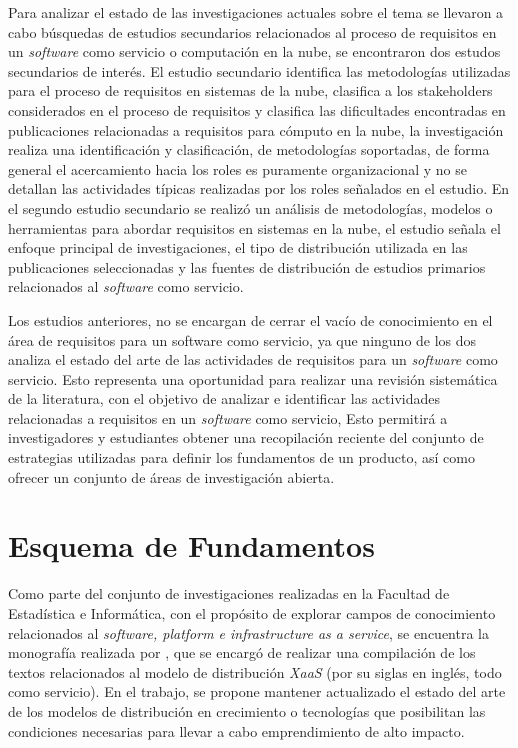 \documentclass{article}
\begin{document}
Para analizar el estado de las investigaciones actuales sobre el tema se llevaron a cabo búsquedas de estudios secundarios 
relacionados al proceso de requisitos en un \emph{software} como servicio o computación en la nube, se encontraron
dos estudos secundarios de interés.
El estudio secundario \cite{zalazar2017analyzing} identifica las metodologías utilizadas para el proceso de requisitos en sistemas de la nube,
clasifica a los stakeholders considerados en el proceso de requisitos y clasifica las dificultades encontradas en publicaciones 
relacionadas a requisitos para cómputo en la nube, la investigación realiza una identificación y clasificación, de metodologías soportadas, de forma general
el acercamiento hacia los roles es puramente organizacional y no se detallan las actividades típicas realizadas por los roles señalados en el estudio. 
En el segundo estudio secundario \cite{wanderley2017requirements} se realizó un análisis de metodologías, modelos o herramientas para abordar requisitos en sistemas en la nube, el estudio 
señala el enfoque principal de investigaciones, el tipo de distribución utilizada en las publicaciones seleccionadas y las fuentes de distribución de 
estudios primarios relacionados al \emph{software} como servicio. 

Los estudios anteriores, no se encargan de cerrar el vacío de conocimiento en el área de requisitos para un software como servicio, ya que ninguno de los dos 
analiza el estado del arte de las actividades de requisitos para un \emph{software} como servicio. Esto representa una oportunidad para realizar una revisión
sistemática de la literatura, con el objetivo de analizar e identificar las actividades relacionadas a requisitos en un \emph{software} como servicio,
Esto permitirá a investigadores y estudiantes obtener una recopilación reciente del conjunto de estrategias utilizadas para definir los fundamentos de un producto, 
así como ofrecer un conjunto de áreas de investigación abierta.


\newpage

\section{Esquema de Fundamentos}
Como parte del conjunto de investigaciones realizadas en la Facultad de Estadística e Informática, con el propósito de
explorar campos de conocimiento relacionados al \emph{software, platform e infrastructure as a service}, se encuentra 
la monografía realizada por \cite{hernandez2020xaas}, que se encargó de realizar una compilación de los textos  
relacionados al modelo de distribución \emph{XaaS} (por su siglas en inglés, todo como servicio). En el trabajo, se propone
mantener actualizado el estado del arte de los modelos de distribución en crecimiento o tecnologías que posibilitan 
las condiciones necesarias para llevar a cabo emprendimiento de alto impacto. 
\end{document}
